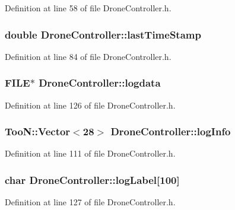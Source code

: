 Definition at line 58 of file Drone\-Controller.\-h.

\subsubsection[{last\-Time\-Stamp}]{\setlength{\rightskip}{0pt plus 5cm}double Drone\-Controller\-::last\-Time\-Stamp\hspace{0.3cm}{\ttfamily [private]}}\label{classDroneController_a2e28a2a5ab280ef3f5cd1e2ace2872f7}


Definition at line 84 of file Drone\-Controller.\-h.

\subsubsection[{logdata}]{\setlength{\rightskip}{0pt plus 5cm}F\-I\-L\-E$\ast$ Drone\-Controller\-::logdata}\label{classDroneController_a8550905c392231257cd0c4acfc78c85b}


Definition at line 126 of file Drone\-Controller.\-h.

\subsubsection[{log\-Info}]{\setlength{\rightskip}{0pt plus 5cm}Too\-N\-::\-Vector$<$28$>$ Drone\-Controller\-::log\-Info}\label{classDroneController_a855a97fa56a44fd2d5e122426fb76c26}


Definition at line 111 of file Drone\-Controller.\-h.

\subsubsection[{log\-Label}]{\setlength{\rightskip}{0pt plus 5cm}char Drone\-Controller\-::log\-Label[100]}\label{classDroneController_ab5e91b65bb1ebe5b77673c264d3e7525}


Definition at line 127 of file Drone\-Controller.\-h.

